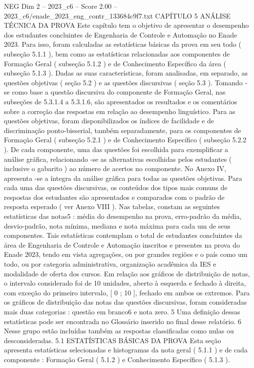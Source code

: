 \begin{textsample}{NEG Dim 2 – 2023\_c6 – Score 2.00 – 2023\_c6/enade\_2023\_eng\_contr\_133684c9f7.txt}  \label{ex:f2_neg_272}
CAPÍTULO 5 ANÁLISE TÉCNICA DA PROVA Este capítulo tem o objetivo de apresentar o desempenho dos estudantes concluintes de Engenharia de Controle e Automação no Enade 2023.
Para isso, foram calculadas as estatísticas básicas da prova em seu todo ( subseção 5.1.1 ), bem como as estatísticas relacionadas aos componentes de Formação Geral ( subseção 5.1.2 ) e de Conhecimento Específico da área ( subseção 5.1.3 ).
Dadas as suas características, foram analisadas, em separado, as questões objetivas ( seção 5.2 ) e as questões discursivas ( seção 5.3 ).
Tomando -se como base a questão discursiva do componente de Formação Geral, nas subseções de 5.3.1.4 a 5.3.1.6, são apresentados os resultados e os comentários sobre a correção das respostas em relação ao desempenho linguístico.
Para as questões objetivas, foram disponibilizados os índices de facilidade e de discriminação ponto-bisserial, também separadamente, para os componentes de Formação Geral ( subseção 5.2.1 ) e de Conhecimento Específico ( subseção 5.2.2 ).
De cada componente, uma das questões foi escolhida para exemplificar a análise gráfica, relacionando -se as alternativas escolhidas pelos estudantes ( inclusive o gabarito ) ao número de acertos no componente.
No Anexo IV, apresenta -se a íntegra da análise gráfica para todas as questões objetivas.
Para cada uma das questões discursivas, os conteúdos dos tipos mais comuns de respostas dos estudantes são apresentados e comparados com o padrão de resposta esperado ( ver Anexo VIII ).
Nas tabelas, constam as seguintes estatísticas das notas5 : média do desempenho na prova, erro-padrão da média, desvio-padrão, nota mínima, mediana e nota máxima para cada um de seus componentes.
Tais estatísticas contemplam o total de estudantes concluintes da área de Engenharia de Controle e Automação inscritos e presentes na prova do Enade 2023, tendo em vista agregações, ou por grandes regiões e o país como um todo, ou por categoria administrativa, organização acadêmica da IES e modalidade de oferta dos cursos.
Em relação aos gráficos de distribuição de notas, o intervalo considerado foi de 10 unidades, aberto à esquerda e fechado à direita, com exceção do primeiro intervalo, [ 0 ; 10 ], fechado em ambos os extremos.
Para os gráficos de distribuição das notas das questões discursivas, foram consideradas mais duas categorias : questão em branco6 e nota zero. 5 Uma definição dessas estatísticas pode ser encontrada no Glossário inserido no final desse relatório. 6 Nesse grupo estão incluídas também as respostas classificadas como nulas ou desconsideradas. 5.1 ESTATÍSTICAS BÁSICAS DA PROVA Esta seção apresenta estatísticas selecionadas e histogramas da nota geral ( 5.1.1 ) e de cada componente : Formação Geral ( 5.1.2 ) e Conhecimento Específico ( 5.1.3 ).

\end{textsample}
